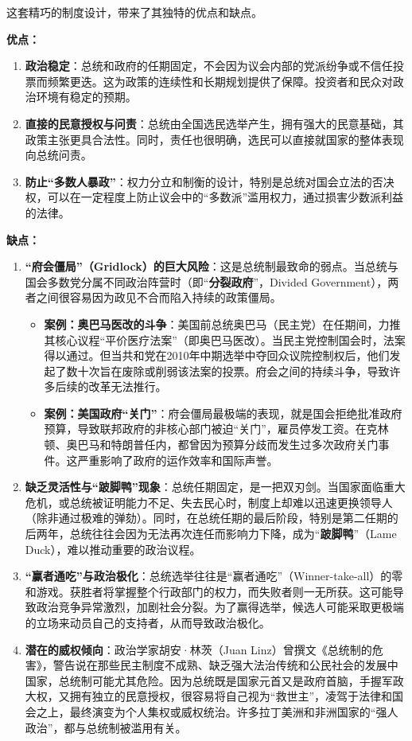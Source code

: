 这套精巧的制度设计，带来了其独特的优点和缺点。

\textbf{优点：}

\begin{enumerate}
    \item \textbf{政治稳定}：总统和政府的任期固定，不会因为议会内部的党派纷争或不信任投票而频繁更迭。这为政策的连续性和长期规划提供了保障。投资者和民众对政治环境有稳定的预期。
    \item \textbf{直接的民意授权与问责}：总统由全国选民选举产生，拥有强大的民意基础，其政策主张更具合法性。同时，责任也很明确，选民可以直接就国家的整体表现向总统问责。
    \item \textbf{防止“多数人暴政”}：权力分立和制衡的设计，特别是总统对国会立法的否决权，可以在一定程度上防止议会中的“多数派”滥用权力，通过损害少数派利益的法律。
\end{enumerate}

\textbf{缺点：}

\begin{enumerate}
    \item \textbf{“府会僵局”（Gridlock）的巨大风险}：这是总统制最致命的弱点。当总统与国会多数党分属不同政治阵营时（即“\textbf{分裂政府}”，Divided Government），两者之间很容易因为政见不合而陷入持续的政策僵局。
    \begin{itemize}
        \item \textbf{案例：奥巴马医改的斗争}：美国前总统奥巴马（民主党）在任期间，力推其核心议程“平价医疗法案”（即奥巴马医改）。当民主党控制国会时，法案得以通过。但当共和党在2010年中期选举中夺回众议院控制权后，他们发起了数十次旨在废除或削弱该法案的投票。府会之间的持续斗争，导致许多后续的改革无法推行。
        \item \textbf{案例：美国政府“关门”}：府会僵局最极端的表现，就是国会拒绝批准政府预算，导致联邦政府的非核心部门被迫“关门”，雇员停发工资。在克林顿、奥巴马和特朗普任内，都曾因为预算分歧而发生过多次政府关门事件。这严重影响了政府的运作效率和国际声誉。
    \end{itemize}
    \item \textbf{缺乏灵活性与“跛脚鸭”现象}：总统任期固定，是一把双刃剑。当国家面临重大危机，或总统被证明能力不足、失去民心时，制度上却难以迅速更换领导人（除非通过极难的弹劾）。同时，在总统任期的最后阶段，特别是第二任期的后两年，总统往往会因为无法再次连任而影响力下降，成为“\textbf{跛脚鸭}”（Lame Duck），难以推动重要的政治议程。
    \item \textbf{“赢者通吃”与政治极化}：总统选举往往是“赢者通吃”（Winner-take-all）的零和游戏。获胜者将掌握整个行政部门的权力，而失败者则一无所获。这可能导致政治竞争异常激烈，加剧社会分裂。为了赢得选举，候选人可能采取更极端的立场来动员自己的支持者，从而导致政治极化。
    \item \textbf{潜在的威权倾向}：政治学家胡安·林茨（Juan Linz）曾撰文《总统制的危害》，警告说在那些民主制度不成熟、缺乏强大法治传统和公民社会的发展中国家，总统制可能尤其危险。因为总统既是国家元首又是政府首脑，手握军政大权，又拥有独立的民意授权，很容易将自己视为“救世主”，凌驾于法律和国会之上，最终演变为个人集权或威权统治。许多拉丁美洲和非洲国家的“强人政治”，都与总统制被滥用有关。
\end{enumerate}

